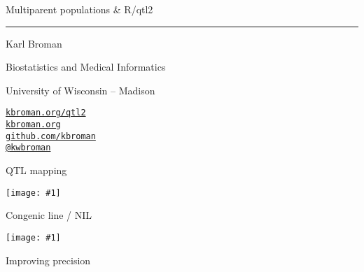 \documentclass[12pt]{article}
\newcommand{\titlesize}{\fontsize{40}{50} \selectfont}
\newcommand{\headsize}{\fontsize{35}{35} \selectfont}
\newcommand{\textsize}{\fontsize{30}{35} \selectfont}
\newcommand{\smallsize}{\fontsize{25}{30} \selectfont}
\newcommand{\figh}[2]{\centerline{\texttt{[image: \#1]}}}
\newcommand{\figw}[2]{\centerline{\texttt{[image: \#1]}}}
\begin{document}
\thispagestyle{empty}

\begin{center}
\titlesize \color{myyellow}


\vspace*{15mm}

Multiparent populations \& R/qtl2

\color{mypink}
\rule{10in}{1mm}

\vspace{5mm}

\textsize \color{myblue}
Karl Broman
\vspace{5mm}

\color{mywhite}
{\smallsize Biostatistics and Medical Informatics

University of Wisconsin -- Madison
\vspace{20mm}


\href{http://kbroman.org/qtl2}{\tt kbroman.org/qtl2} \\[3pt]
\href{http://kbroman.org}{\tt kbroman.org} \\[3pt]
\href{https://github.com/kbroman}{\tt github.com/kbroman} \\
\href{https://twitter.com/kwbroman}{\tt @kwbroman} \\
}

\end{center}



\newpage


\headsize \color{myyellow}
\hfill \begin{minipage}{5.75in}
\centering
QTL mapping
\end{minipage}

\vspace{5mm}

\figh{Figs/lodcurve_insulin_with_effects.pdf}{0.9}

\newpage


\headsize \color{myyellow}
\hfill \begin{minipage}{5.75in}
\centering
Congenic line / NIL
\end{minipage}


\figw{Figs/congenic.pdf}{1.0}

\newpage



\headsize \color{myyellow}
\hfill \begin{minipage}{5.75in}
\centering
Improving precision
\end{minipage}


\vspace{3cm}
\end{document}
